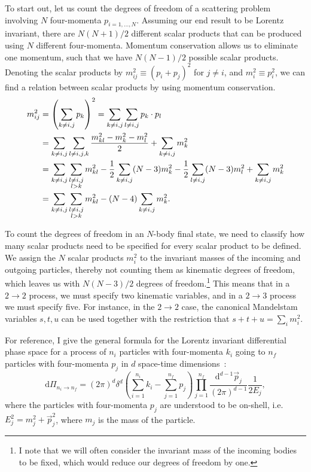 \documentclass[../main.tex]{subfiles}
\begin{document}
To start out, let us count the degrees
of freedom of a scattering problem involving \(N\) four-momenta
\(p_{i=1,\ldots,N}\).
Assuming our end result to be Lorentz invariant, there are \(N(N+1)/2\) different scalar products that can be produced using \(N\) different four-momenta.
Momentum conservation allows us to eliminate one momentum, such that we have \(N(N-1)/2\) possible scalar products.
Denoting the scalar products by \(m^2_{ij} \equiv (p_i + p_j)^2\) for \(j \neq i\), and \(m^2_i \equiv p_i^2\), we can find a relation between scalar products by using momentum conservation.
\begin{align}
  \label{pc:eq:generalised_mandelstam_relation}
  \nonumber
  m^2_{ij} & = \left(\sum_{k \neq i,j} p_k\right)^2 = \sum_{k\neq i,j} \sum_{l\neq i,j} p_k\cdot p_l \\
  \nonumber
           & = \sum_{k\neq i,j} \sum_{l\neq i,j,k} \frac{m^2_{kl} - m^2_k
  - m^2_l}{2} + \sum_{k\neq i,j} m^2_k
  \\
  \nonumber
           & = \sum_{k\neq i,j} \sum_{\substack{l\neq i,j
  \\l>k}} m^2_{kl}
  - \frac{1}{2} \sum_{k\neq i, j} (N-3) m^2_k - \frac{1}{2} \sum_{l\neq
    i,j}
  (N-3) m^2_l + \sum_{k\neq i,j} m^2_k
  \\
           & = \sum_{k\neq i,j} \sum_{\substack{l\neq i,j
  \\l>k}} m^2_{kl}
  - (N-4) \sum_{k\neq i, j} m^2_k.
\end{align}

To count the degrees of freedom in an \(N\)-body final state, we need to classify how many scalar products need to be specified for every scalar product to be defined.
We assign the \(N\) scalar products \(m^2_i\) to the invariant masses of the incoming and outgoing particles, thereby not counting them as kinematic degrees of freedom, which leaves us with \(N(N-3)/2\) degrees of freedom.\footnote{I note that we
  will often consider the invariant mass of the incoming bodies to be fixed, which would reduce our degrees of freedom by one.}
This means that in a \(2\to 2\) process, we must specify two kinematic variables, and in a \(2\to 3\) process we must specify five.
For instance, in the \(2\to 2\) case, the canonical Mandelstam variables \(s, t, u\) can be used together with the restriction that \(s+t+u = \sum_i m_i^2\).

For reference, I give the general formula for the Lorentz invariant differential phase space for a process of \(n_i\) particles with four-momenta \(k_i\) going to \(n_f\) particles with four-momenta \(p_j\) in \(d\) space-time dimensions~\cite{Schwartz:2014sze}:
\begin{equation}
  \label{pc:eq:dPi_d}
  \mathrm{d}\Pi_{n_i \to n_f} =  (2\pi)^d \delta^d(\sum_{i=1}^{n_i} k_i - \sum_{j=1}^{n_f} p_j) \prod_{j=1}^{n_f} \frac{\mathrm{d}^{d-1}\vec{p}_j}{(2\pi)^{d-1}} \frac{1}{2E_j},
\end{equation}
where the particles with four-momenta \(p_j\) are understood to be  on-shell, i.e.\ \(E_j^2 = m_j^2 + \vec{p}_j^2\), where \(m_j\) is the mass of the particle.
\end{document}
